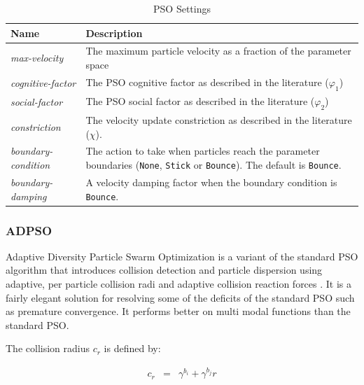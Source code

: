 \documentclass{article}
\begin{document}
\begin{table}[h!tb]\caption{PSO Settings}\label{tab:pso_settings}\vspace{0.1in}
	\centering

	\begin{tabular}{p{4cm} p{10cm}}
		\toprule
		\textbf{Name} & \textbf{Description} \\
		\midrule
		\textit{max-velocity} & The maximum particle velocity as a fraction of
		                        the parameter space \\
		\textit{cognitive-factor} & The PSO cognitive factor as described in the
		                            literature ($\varphi_1$) \\
		\textit{social-factor} & The PSO social factor as described in the
		                         literature ($\varphi_2$) \\
		\textit{constriction} & The velocity update constriction as described
		                        in the literature ($\chi$). \\
		\textit{boundary-condition} & The action to take when particles reach
		                              the parameter boundaries (\verb!None!,
		                              \verb!Stick! or \verb!Bounce!). The
		                              default is \verb!Bounce!. \\
		\textit{boundary-damping} & A velocity damping factor when the boundary
		                            condition is \verb!Bounce!. \\
		\bottomrule
	\end{tabular}
\end{table}

\subsubsection{ADPSO}
Adaptive Diversity Particle Swarm Optimization is a variant of the standard
PSO algorithm that introduces collision detection and particle dispersion
using adaptive, per particle collision radi and adaptive collision reaction
forces \cite{monson_ad_2006}. It is a fairly elegant solution for resolving
some of the deficits of the standard PSO such as premature convergence. It
performs better on multi modal functions than the standard PSO.

The collision radius $c_r$ is defined by:

\begin{eqnarray*}
	c_r & = & \gamma^{b_i} + \gamma^{b_j} r
\end{eqnarray*}
\end{document}

